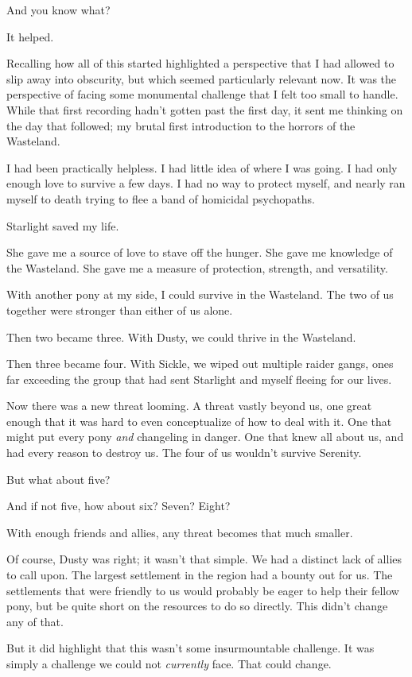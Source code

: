 And you know what?

It helped.

Recalling how all of this started highlighted a perspective that I had allowed to slip away into obscurity, but which seemed particularly relevant now. It was the perspective of facing some monumental challenge that I felt too small to handle. While that first recording hadn’t gotten past the first day, it sent me thinking on the day that followed; my brutal first introduction to the horrors of the Wasteland.

I had been practically helpless. I had little idea of where I was going. I had only enough love to survive a few days. I had no way to protect myself, and nearly ran myself to death trying to flee a band of homicidal psychopaths.

Starlight saved my life.

She gave me a source of love to stave off the hunger. She gave me knowledge of the Wasteland. She gave me a measure of protection, strength, and versatility.

With another pony at my side, I could survive in the Wasteland. The two of us together were stronger than either of us alone.

Then two became three. With Dusty, we could thrive in the Wasteland.

Then three became four. With Sickle, we wiped out multiple raider gangs, ones far exceeding the group that had sent Starlight and myself fleeing for our lives.

Now there was a new threat looming. A threat vastly beyond us, one great enough that it was hard to even conceptualize of how to deal with it. One that might put every pony \textit{and} changeling in danger. One that knew all about us, and had every reason to destroy us. The four of us wouldn’t survive Serenity.

But what about five?

And if not five, how about six? Seven? Eight?

With enough friends and allies, any threat becomes that much smaller.

Of course, Dusty was right; it wasn’t that simple. We had a distinct lack of allies to call upon. The largest settlement in the region had a bounty out for us. The settlements that were friendly to us would probably be eager to help their fellow pony, but be quite short on the resources to do so directly. This didn’t change any of that.

But it did highlight that this wasn’t some insurmountable challenge. It was simply a challenge we could not \textit{currently} face. That could change.

